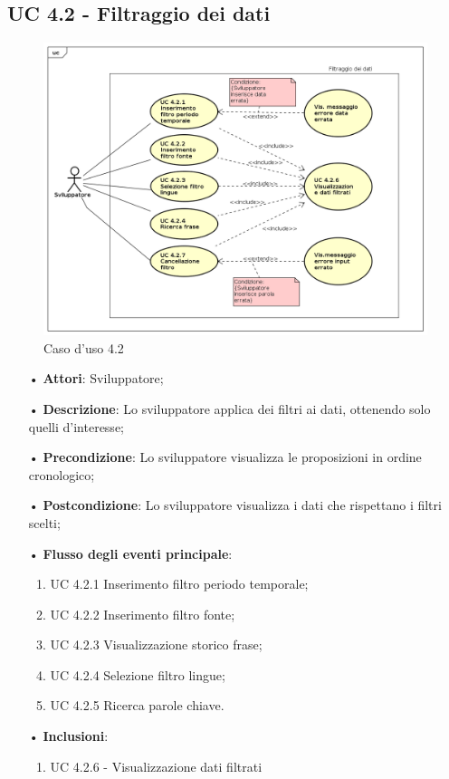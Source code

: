 \subsection{UC 4.2 - Filtraggio dei dati}
\begin{figure}[H]
\centering
\includegraphics[width=17cm]{img/UC420.png} 
\caption{Caso d'uso 4.2}\label{fig:420}
\end{figure}
\begin{itemize}
\item[•]\textbf{Attori}: Sviluppatore;
\item[•]\textbf{Descrizione}: Lo sviluppatore applica dei filtri ai dati, ottenendo solo quelli d’interesse;
\item[•]\textbf{Precondizione}: Lo sviluppatore visualizza le proposizioni in ordine cronologico;
\item[•]\textbf{Postcondizione}: Lo sviluppatore visualizza i dati che rispettano i filtri scelti;
\item[•]\textbf{Flusso degli eventi principale}:
\begin{enumerate}
\item UC 4.2.1 Inserimento filtro periodo temporale;
\item UC 4.2.2 Inserimento filtro fonte;
\item UC 4.2.3 Visualizzazione storico frase;
\item UC 4.2.4 Selezione filtro lingue;
\item UC 4.2.5 Ricerca parole chiave.
\end{enumerate}
\item[•]\textbf{Inclusioni}:
\begin{enumerate}
\item UC 4.2.6 - Visualizzazione dati filtrati
\end{enumerate}
\end{itemize}
